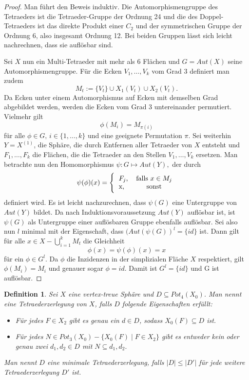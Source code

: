 \documentclass[12pt,titlepage,twoside,cleardoublepage]{article}
\theoremstyle{nummermitklammern}
\newtheorem{definition}[temp]{Definition}
\newtheorem{definition}[zahl]{Definition}
\numberwithin{equation}{section}
\begin{document}
\begin{proof}
Man führt den Beweis induktiv. Die Automorphismengruppe des Tetraeders ist die Tetraeder-Gruppe der Ordnung 24 und die des Doppel-Tetraeders ist das direkte Produkt einer $C_2$ und der symmetrischen Gruppe der Ordnung 6, also insgesamt Ordnung 12. Bei beiden Gruppen lässt sich leicht nachrechnen, dass sie auflösbar sind.

Sei $X$ nun ein Multi-Tetraeder mit mehr als  6 Flächen und $G=Aut(X)$ seine Automorphismengruppe. Für die Ecken $V_1,\ldots,V_k$ vom Grad $3$ definiert man zudem 
\[
M_t:=\{V_t\} \cup X_1(V_t) \cup X_2(V_t).  
\] 
Da Ecken unter einem Automorphismus auf Ecken mit demselben Grad abgebildet werden, werden die Ecken vom Grad 3 untereinander permutiert. Vielmehr gilt 
\[
\phi(M_i)=M_{\pi(i)} 
\]
für alle $\phi \in G,\,i\in \{1,\ldots,k\}$ und eine geeignete Permutation $\pi.$ Sei weiterhin $Y=X^{(1)}$, die Sphäre, die durch Entfernen aller Tetraeder von $X$ entsteht und $F_1,\ldots,F_k$ die Flächen, die die Tetraeder an den Stellen $V_1,\ldots,V_k$ ersetzen. Man betrachte nun den Homomorphismus $\psi:G\mapsto Aut(Y),$ der durch  
\[
\psi(\phi)(x)=\Biggl\{
\begin{tabular}[l]{lcr}
$F_j$,&\textcolor{black}{ falls  $x\in M_j$} \\
x,& sonst\\
\end{tabular}
\]
definiert wird. Es ist leicht nachzurechnen, dass $\psi(G)$ eine Untergruppe von $Aut(Y)$ bildet. Da nach Induktionsvoraussetzung $Aut(Y)$ auflösbar ist, ist $\psi(G)$ als Untergruppe einer auflösbaren Gruppe ebenfalls auflösbar. 
Sei also nun $l$ minimal mit der Eigenschaft, dass $(Aut(\psi(G))^l=\{id\}$ ist. Dann gilt für alle $x\in X-\bigcup_{i=1}^k M_t$ die Gleichheit 
\[
\phi(x)=\psi(\phi)(x)=x
\] für ein $\phi \in G^l$. Da $\phi$ die Inzidenzen in der simplizialen Fläche $X$ respektiert, gilt $\phi(M_i)=M_i$ und genauer sogar $\phi=id.$ Damit ist $G^l =\{id\}$ und G ist auflösbar.
  
\end{proof}

\begin{definition}
Sei $X$ eine vertex-treue Sphäre und $D\subseteq Pot_4(X_0)$. Man nennt eine Tetraederzerlegung von $X$, falls $D$ folgende Eigenschaften erfüllt:
\begin{itemize}
\item Für jedes $F\in X_2$ gibt es genau ein $d\in D$, sodass $X_0(F) \subseteq D$ ist.
\item Für jedes $N\in Pot_3(X_0)-\{X_0(F)\mid F\in X_2\}$ gibt es entweder kein oder genau zwei $d_1,d_2\in D$ mit $N\subseteq d_1,d_2.$
\end{itemize}
Man nennt $D$ eine minimale Tetraederzerlegung, falls $\vert D \vert\leq \vert D' \vert$ für jede weitere Tetraederzerlegung $D'$ ist.
\end{definition}
\end{document}
